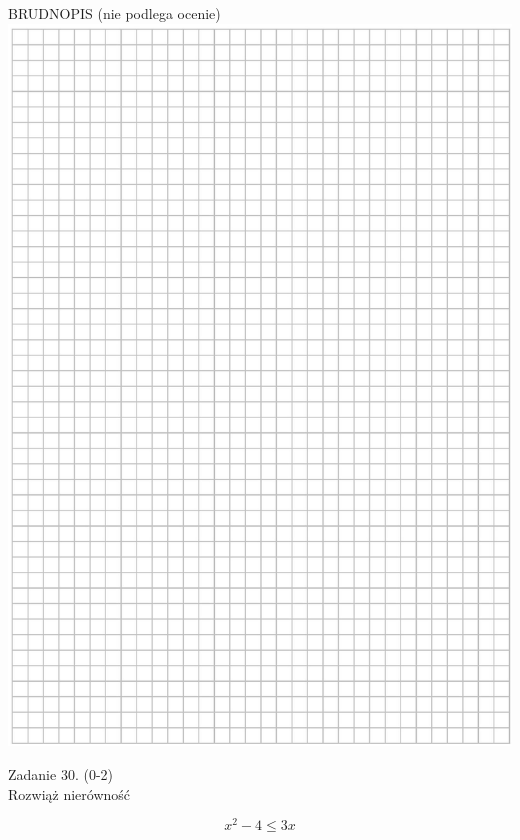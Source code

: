 \documentclass[10pt]{article}
\begin{document}
BRUDNOPIS (nie podlega ocenie)\\
\includegraphics[max width=\textwidth, center]{2024_11_21_0a35d272448d5080a489g-21}

Zadanie 30. (0-2)\\
Rozwiąż nierówność

\[
x^{2}-4 \leq 3 x
\]
\end{document}
